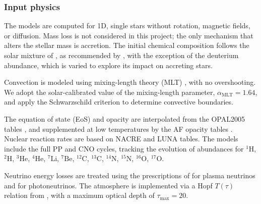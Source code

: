 \documentclass[12pt,a4paper]{article}
\newcommand{\mr}{\mathrm}
\begin{document}
\subsubsection{Input physics}
\label{sec:cesam2k20_input_physics}

The models are computed for 1D, single stars without rotation, magnetic fields, or diffusion. Mass loss is not considered in this project; the only mechanism that alters the stellar mass is accretion. The initial chemical composition follows the solar mixture of \textcite{AsplundEtAl2009}, as recommended by \textcite{SerenelliEtAl2009}, with the exception of the deuterium abundance, which is varied to explore its impact on accreting stars.

Convection is modeled using mixing-length theory (MLT) \parencite{CoxGiuli1968a}, with no overshooting. We adopt the solar-calibrated value of the mixing-length parameter, $\alpha_\mr{MLT} = 1.64$, and apply the Schwarzschild criterion to determine convective boundaries.

The equation of state (EoS) and opacity are interpolated from the OPAL2005 tables \parencite{RogersIglesias1992,IglesiasRogers1996,RogersNayfonov2002}, and supplemented at low temperatures by the AF opacity tables \parencite{FergusonEtAl2005}. Nuclear reaction rates are based on NACRE \parencite{AikawaEtAl2006} and LUNA \parencite{BrogginiEtAl2018} tables. The models include the full PP and CNO cycles, tracking the evolution of abundances for $^{1}\mr{H}$, $^{2}\mr{H}$, $^{3}\mr{He}$, $^{4}\mr{He}$, $^{7}\mr{Li}$, $^{7}\mr{Be}$, $^{12}\mr{C}$, $^{13}\mr{C}$, $^{14}\mr{N}$, $^{15}\mr{N}$, $^{16}\mr{O}$, $^{17}\mr{O}$.

Neutrino energy losses are treated using the prescriptions of \textcite{HaftEtAl1994} for plasma neutrinos and \textcite{Weigert1966} for photoneutrinos. The atmosphere is implemented via a Hopf $T(\tau)$ relation from \textcite{HubenyMihalas2015}, with a maximum optical depth of $\tau_{\max} = 20$.
\end{document}
